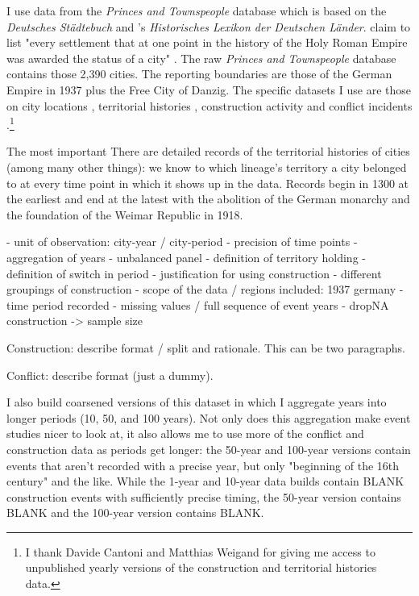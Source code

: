 \documentclass[11pt, a4paper]{article}
\begin{document}
I use data from the \textit{Princes and Townspeople} database which is based on the \textit{Deutsches Städtebuch} \citep{keyser1939} and \cite{kobler2007}'s \textit{Historisches Lexikon der Deutschen Länder}. \cite{keyser1939} claim to  list "every settlement that at one point in the history of the Holy Roman Empire was awarded the status of a city" \citep[p. 2]{pt1}. The raw \textit{Princes and Townspeople} database contains those 2,390 cities. The reporting boundaries are those of the German Empire in 1937 plus the Free City of Danzig. The specific datasets I use are those on city locations \citep{pt1}, territorial histories \citep{pt2}, construction activity \citep{pt5} and conflict incidents \citep{pt6}.\footnote{I thank Davide Cantoni and Matthias Weigand for giving me access to unpublished yearly versions of the construction and territorial histories data.} 

The most important There are detailed records of the territorial histories of cities (among many other things): we know to which lineage's territory a city belonged to at every time point in which it shows up in the data. Records begin in 1300 at the earliest and end at the latest with the abolition of the German monarchy and the foundation of the Weimar Republic in 1918. 

- unit of observation: city-year / city-period
- precision of time points
- aggregation of years
- unbalanced panel
- definition of territory holding
- definition of switch in period
- justification for using construction
- different groupings of construction
- scope of the data / regions included: 1937 germany
- time period recorded
- missing values / full sequence of event years
- dropNA construction -> sample size





Construction: describe format / split and rationale. This can be two paragraphs.

Conflict: describe format (just a dummy).


I also build coarsened versions of this dataset in which I aggregate years into longer periods (10, 50, and 100 years). Not only does this aggregation make event studies nicer to look at, it also allows me to use more of the conflict and construction data as periods get longer: the 50-year and 100-year versions contain events that aren't recorded with a precise year, but only "beginning of the 16th century" and the like. While the 1-year and 10-year data builds contain BLANK construction events with sufficiently precise timing, the 50-year version contains BLANK and the 100-year version contains BLANK.
\end{document}
